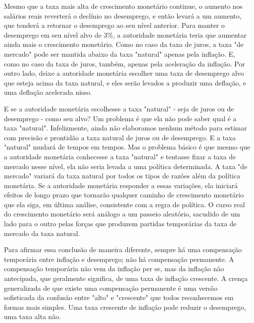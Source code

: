 \documentclass[a4paper,12pt]{article}[abntex2]
\begin{document}
Mesmo que a taxa mais alta de crescimento monetário continue, o aumento nos salários reais reverterá o declínio no desemprego, e então levará a um aumento, que tenderá a retornar o desemprego ao seu nível anterior. Para manter o desemprego em seu nível alvo de 3\%, a autoridade monetária teria que aumentar ainda mais o crescimento monetário. Como no caso da taxa de juros, a taxa "de mercado" pode ser mantida abaixo da taxa "natural" apenas pela inflação. E, como no caso da taxa de juros, também, apenas pela aceleração da inflação. Por outro lado, deixe a autoridade monetária escolher uma taxa de desemprego alvo que esteja acima da taxa natural, e eles serão levados a produzir uma deflação, e uma deflação acelerada nisso.

E se a autoridade monetária escolhesse a taxa "natural" - seja de juros ou de desemprego - como seu alvo? Um problema é que ela não pode saber qual é a taxa "natural". Infelizmente, ainda não elaboramos nenhum método para estimar com precisão e prontidão a taxa natural de juros ou de desemprego. E a taxa "natural" mudará de tempos em tempos. Mas o problema básico é que mesmo que a autoridade monetária conhecesse a taxa "natural" e tentasse fixar a taxa de mercado nesse nível, ela não seria levada a uma política determinada. A taxa "de mercado" variará da taxa natural por todos os tipos de razões além da política monetária. Se a autoridade monetária responder a essas variações, ela iniciará efeitos de longo prazo que tornarão qualquer caminho de crescimento monetário que ela siga, em última análise, consistente com a regra de política. O curso real do crescimento monetário será análogo a um passeio aleatório, sacudido de um lado para o outro pelas forças que produzem partidas temporárias da taxa de mercado da taxa natural.

Para afirmar essa conclusão de maneira diferente, sempre há uma compensação temporária entre inflação e desemprego; não há compensação permanente. A compensação temporária não vem da inflação per se, mas da inflação não antecipada, que geralmente significa, de uma taxa de inflação crescente. A crença generalizada de que existe uma compensação permanente é uma versão sofisticada da confusão entre "alto" e "crescente" que todos reconhecemos em formas mais simples. Uma taxa crescente de inflação pode reduzir o desemprego, uma taxa alta não.
\end{document}
